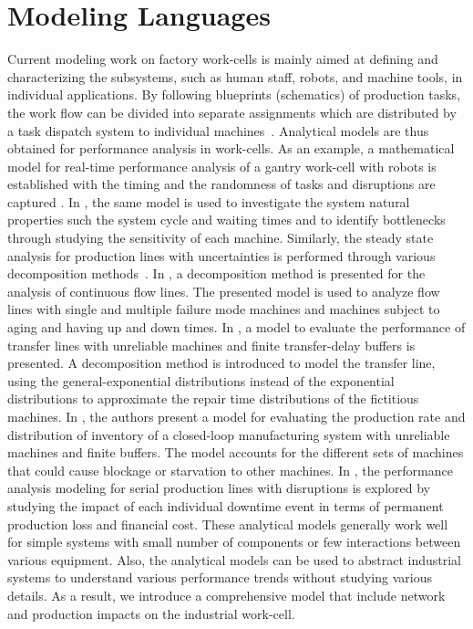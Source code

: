 \section{Modeling Languages} \label{sysml:sec:languages}

Current modeling work on factory work-cells is mainly aimed at defining and characterizing the subsystems, such as human staff, robots, and machine tools, in individual applications. By following blueprints (schematics) of production tasks, the work flow can be divided into separate assignments which are distributed by a task dispatch system to individual machines~\cite{IkeaBot}. Analytical models are thus obtained for performance analysis in work-cells. As an example, a mathematical model for real-time performance analysis of a gantry work-cell with robots is established with the timing and the randomness of tasks and disruptions are captured  \cite{8098604}. In \cite{OU2017212}, the same model is used to investigate the system natural properties such the system cycle and waiting times and to identify bottlenecks through studying the sensitivity of each machine. Similarly, the steady state analysis for production lines with uncertainties is performed through various decomposition methods~\cite{Colledani2013,doi:10.1080/00207543.2012.713137,doi:10.1080/00207540500385980}. In \cite{Colledani2013}, a decomposition method is presented for the analysis of continuous flow lines. The presented model is used to analyze flow lines with single and multiple failure mode machines and machines subject to aging and having up and down times. In \cite{doi:10.1080/00207543.2012.713137}, a model to evaluate the performance of transfer lines with unreliable machines and finite transfer-delay buffers is presented. A decomposition method is introduced to model the transfer line, using the general-exponential distributions instead of the exponential distributions to approximate the repair time distributions of the fictitious machines. In \cite{doi:10.1080/00207540500385980}, the authors present a model for evaluating the production rate and distribution of inventory of a closed-loop manufacturing system with unreliable machines and finite buffers. The model accounts for the different sets of machines that could cause blockage or starvation to other machines. In \cite{QChang,Liu2012}, the performance analysis modeling for serial production lines with disruptions is explored by studying the impact of each individual downtime event in terms of permanent production loss and financial cost. These analytical models generally work well for simple systems with small number of components or few interactions between various equipment. Also, the analytical models can be used to abstract industrial systems to understand various performance trends without studying various details. As a result, we introduce a comprehensive model that include network and production impacts on the industrial work-cell.  

